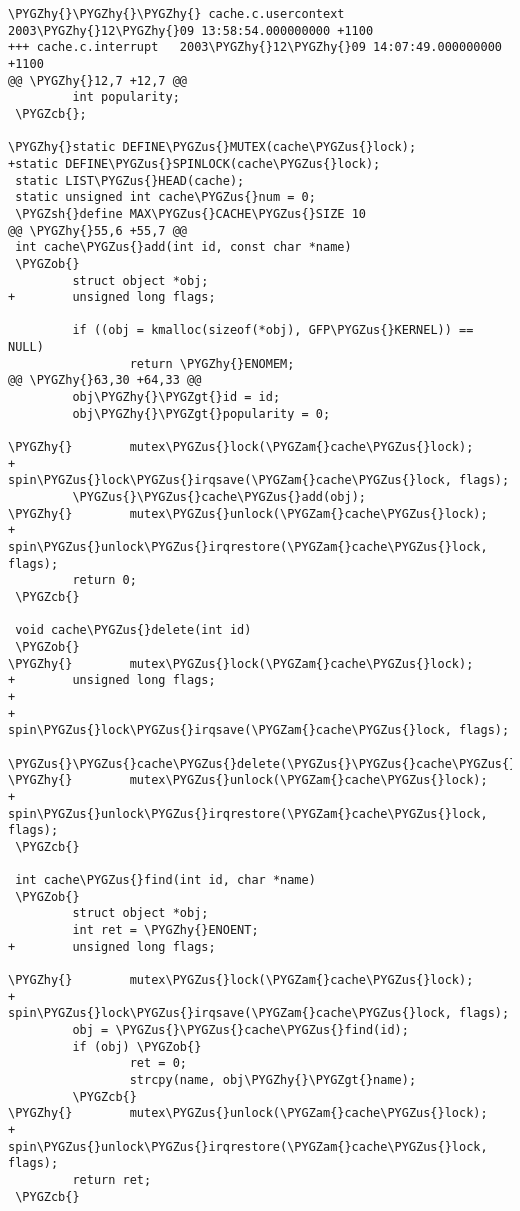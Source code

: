 \documentclass[a4paper,8pt,english]{sphinxmanual}
\def\PYGZus{\char`\_}
\def\PYGZob{\char`\{}
\def\PYGZcb{\char`\}}
\def\PYGZam{\char`\&}
\def\PYGZgt{\char`\>}
\def\PYGZsh{\char`\#}
\def\PYGZhy{\char`\-}
\begin{document}
\begin{Verbatim}[commandchars=\\\{\}]
\PYGZhy{}\PYGZhy{}\PYGZhy{} cache.c.usercontext 2003\PYGZhy{}12\PYGZhy{}09 13:58:54.000000000 +1100
+++ cache.c.interrupt   2003\PYGZhy{}12\PYGZhy{}09 14:07:49.000000000 +1100
@@ \PYGZhy{}12,7 +12,7 @@
         int popularity;
 \PYGZcb{};

\PYGZhy{}static DEFINE\PYGZus{}MUTEX(cache\PYGZus{}lock);
+static DEFINE\PYGZus{}SPINLOCK(cache\PYGZus{}lock);
 static LIST\PYGZus{}HEAD(cache);
 static unsigned int cache\PYGZus{}num = 0;
 \PYGZsh{}define MAX\PYGZus{}CACHE\PYGZus{}SIZE 10
@@ \PYGZhy{}55,6 +55,7 @@
 int cache\PYGZus{}add(int id, const char *name)
 \PYGZob{}
         struct object *obj;
+        unsigned long flags;

         if ((obj = kmalloc(sizeof(*obj), GFP\PYGZus{}KERNEL)) == NULL)
                 return \PYGZhy{}ENOMEM;
@@ \PYGZhy{}63,30 +64,33 @@
         obj\PYGZhy{}\PYGZgt{}id = id;
         obj\PYGZhy{}\PYGZgt{}popularity = 0;

\PYGZhy{}        mutex\PYGZus{}lock(\PYGZam{}cache\PYGZus{}lock);
+        spin\PYGZus{}lock\PYGZus{}irqsave(\PYGZam{}cache\PYGZus{}lock, flags);
         \PYGZus{}\PYGZus{}cache\PYGZus{}add(obj);
\PYGZhy{}        mutex\PYGZus{}unlock(\PYGZam{}cache\PYGZus{}lock);
+        spin\PYGZus{}unlock\PYGZus{}irqrestore(\PYGZam{}cache\PYGZus{}lock, flags);
         return 0;
 \PYGZcb{}

 void cache\PYGZus{}delete(int id)
 \PYGZob{}
\PYGZhy{}        mutex\PYGZus{}lock(\PYGZam{}cache\PYGZus{}lock);
+        unsigned long flags;
+
+        spin\PYGZus{}lock\PYGZus{}irqsave(\PYGZam{}cache\PYGZus{}lock, flags);
         \PYGZus{}\PYGZus{}cache\PYGZus{}delete(\PYGZus{}\PYGZus{}cache\PYGZus{}find(id));
\PYGZhy{}        mutex\PYGZus{}unlock(\PYGZam{}cache\PYGZus{}lock);
+        spin\PYGZus{}unlock\PYGZus{}irqrestore(\PYGZam{}cache\PYGZus{}lock, flags);
 \PYGZcb{}

 int cache\PYGZus{}find(int id, char *name)
 \PYGZob{}
         struct object *obj;
         int ret = \PYGZhy{}ENOENT;
+        unsigned long flags;

\PYGZhy{}        mutex\PYGZus{}lock(\PYGZam{}cache\PYGZus{}lock);
+        spin\PYGZus{}lock\PYGZus{}irqsave(\PYGZam{}cache\PYGZus{}lock, flags);
         obj = \PYGZus{}\PYGZus{}cache\PYGZus{}find(id);
         if (obj) \PYGZob{}
                 ret = 0;
                 strcpy(name, obj\PYGZhy{}\PYGZgt{}name);
         \PYGZcb{}
\PYGZhy{}        mutex\PYGZus{}unlock(\PYGZam{}cache\PYGZus{}lock);
+        spin\PYGZus{}unlock\PYGZus{}irqrestore(\PYGZam{}cache\PYGZus{}lock, flags);
         return ret;
 \PYGZcb{}
\end{Verbatim}
\end{document}
